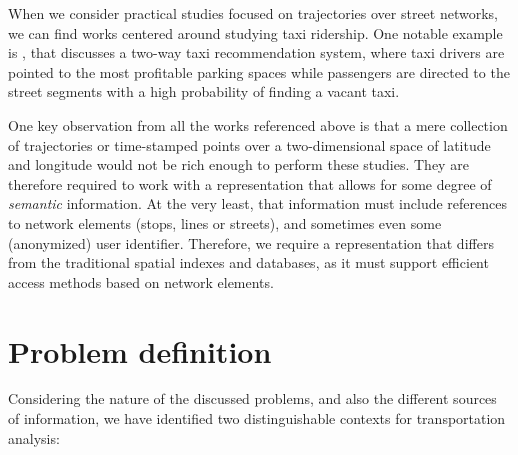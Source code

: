 \documentclass[a4paper,10pt,twoside]{book}
\begin{document}
	When we consider practical studies focused on trajectories over street networks, we can find works centered around studying taxi ridership. One notable example is \cite{yuan2013t}, that discusses a two-way taxi recommendation system, where taxi drivers are pointed to the most profitable parking spaces while passengers are directed to the street segments with a high probability of finding a vacant taxi.
	
	One key observation from all the works referenced above is that a mere collection of trajectories or time-stamped points over a two-dimensional space of latitude and longitude would not be rich enough to perform these studies. They are therefore required to work with a representation that allows for some degree of \textit{semantic} information. At the very least, that information must include references to network elements (stops, lines or streets), and sometimes even some (anonymized) user identifier. Therefore, we require a representation that differs from the traditional spatial indexes and databases, as it must support efficient access methods based on network elements.
	
	\section{Problem definition}
	\label{sec:pd}
	Considering the nature of the discussed problems, and also the different sources of information, we have identified two distinguishable contexts for transportation analysis:
	
\end{document}
